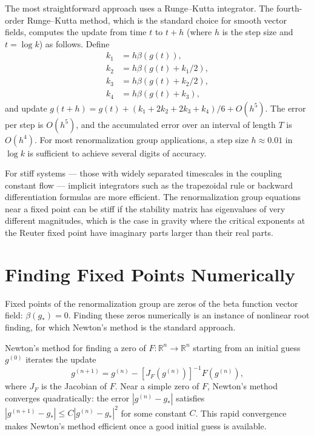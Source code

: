 \documentclass[11pt, twoside, openright]{book}
\theoremstyle{dotted}
\theoremstyle{definition}
\begin{document}
The most straightforward approach uses a Runge--Kutta integrator. The fourth-order
Runge--Kutta method, which is the standard choice for smooth vector fields, computes
the update from time $t$ to $t + h$ (where $h$ is the step size and $t = \log k$)
as follows. Define
\begin{align}
  k_1 &= h\beta(g(t)), \\
  k_2 &= h\beta(g(t) + k_1/2), \\
  k_3 &= h\beta(g(t) + k_2/2), \\
  k_4 &= h\beta(g(t) + k_3),
  \label{eq:rk4}
\end{align}
and update $g(t+h) = g(t) + (k_1 + 2k_2 + 2k_3 + k_4)/6 + O(h^5)$. The error per
step is $O(h^5)$, and the accumulated error over an interval of length $T$ is
$O(h^4)$. For most renormalization group applications, a step size $h \approx 0.01$
in $\log k$ is sufficient to achieve several digits of accuracy.

For stiff systems --- those with widely separated timescales in the coupling constant
flow --- implicit integrators such as the trapezoidal rule or backward differentiation
formulas are more efficient. The renormalization group equations near a fixed point
can be stiff if the stability matrix has eigenvalues of very different magnitudes,
which is the case in gravity where the critical exponents at the Reuter fixed point
have imaginary parts larger than their real parts.

\section{Finding Fixed Points Numerically}

Fixed points of the renormalization group are zeros of the beta function vector
field: $\beta(g_*) = 0$. Finding these zeros numerically is an instance of
nonlinear root finding, for which Newton's method is the standard approach.

Newton's method for finding a zero of $F: \mathbb{R}^n \to \mathbb{R}^n$ starting
from an initial guess $g^{(0)}$ iterates the update
\begin{equation}
  g^{(n+1)} = g^{(n)} - [J_F(g^{(n)})]^{-1} F(g^{(n)}),
  \label{eq:newton_method}
\end{equation}
where $J_F$ is the Jacobian of $F$. Near a simple zero of $F$, Newton's method
converges quadratically: the error $|g^{(n)} - g_*|$ satisfies
$|g^{(n+1)} - g_*| \leq C|g^{(n)} - g_*|^2$ for some constant $C$. This rapid
convergence makes Newton's method efficient once a good initial guess is available.
\end{document}
